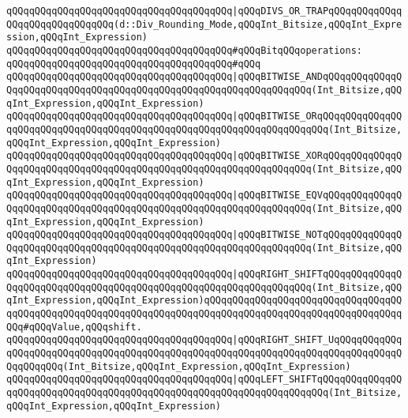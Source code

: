 \verb|qQQqqQQqqQQqqQQqqQQqqQQqqQQqqQQqqQQqqQQq|\verb#|qQQqDIVS_OR_TRAPqQQqqQQqqQQqqQQqqQQqqQQqqQQqqQQq(d::Div_Rounding_Mode,qQQqInt_Bitsize,qQQqInt_Expression,qQQqInt_Expression)#\newline
\newline
\verb|qQQqqQQqqQQqqQQqqQQqqQQqqQQqqQQqqQQqqQQq#qQQqBitqQQqoperations:|\newline
\verb|qQQqqQQqqQQqqQQqqQQqqQQqqQQqqQQqqQQqqQQq#qQQq|\newline
\verb|qQQqqQQqqQQqqQQqqQQqqQQqqQQqqQQqqQQqqQQq|\verb#|qQQqBITWISE_ANDqQQqqQQqqQQqqQQqqQQqqQQqqQQqqQQqqQQqqQQqqQQqqQQqqQQqqQQqqQQqqQQqqQQq(Int_Bitsize,qQQqInt_Expression,qQQqInt_Expression)#\newline
\verb|qQQqqQQqqQQqqQQqqQQqqQQqqQQqqQQqqQQqqQQq|\verb#|qQQqBITWISE_ORqQQqqQQqqQQqqQQqqQQqqQQqqQQqqQQqqQQqqQQqqQQqqQQqqQQqqQQqqQQqqQQqqQQqqQQq(Int_Bitsize,qQQqInt_Expression,qQQqInt_Expression)#\newline
\verb|qQQqqQQqqQQqqQQqqQQqqQQqqQQqqQQqqQQqqQQq|\verb#|qQQqBITWISE_XORqQQqqQQqqQQqqQQqqQQqqQQqqQQqqQQqqQQqqQQqqQQqqQQqqQQqqQQqqQQqqQQqqQQq(Int_Bitsize,qQQqInt_Expression,qQQqInt_Expression)#\newline
\verb|qQQqqQQqqQQqqQQqqQQqqQQqqQQqqQQqqQQqqQQq|\verb#|qQQqBITWISE_EQVqQQqqQQqqQQqqQQqqQQqqQQqqQQqqQQqqQQqqQQqqQQqqQQqqQQqqQQqqQQqqQQqqQQq(Int_Bitsize,qQQqInt_Expression,qQQqInt_Expression)#\newline
\verb|qQQqqQQqqQQqqQQqqQQqqQQqqQQqqQQqqQQqqQQq|\verb#|qQQqBITWISE_NOTqQQqqQQqqQQqqQQqqQQqqQQqqQQqqQQqqQQqqQQqqQQqqQQqqQQqqQQqqQQqqQQqqQQq(Int_Bitsize,qQQqInt_Expression)#\newline
\newline
\verb|qQQqqQQqqQQqqQQqqQQqqQQqqQQqqQQqqQQqqQQq|\verb#|qQQqRIGHT_SHIFTqQQqqQQqqQQqqQQqqQQqqQQqqQQqqQQqqQQqqQQqqQQqqQQqqQQqqQQqqQQqqQQqqQQq(Int_Bitsize,qQQqInt_Expression,qQQqInt_Expression)qQQqqQQqqQQqqQQqqQQqqQQqqQQqqQQqqQQqqQQqqQQqqQQqqQQqqQQqqQQqqQQqqQQqqQQqqQQqqQQqqQQqqQQqqQQqqQQqqQQqqQQqqQQq#\verb|#qQQqValue,qQQqshift.|\newline
\verb|qQQqqQQqqQQqqQQqqQQqqQQqqQQqqQQqqQQqqQQq|\verb#|qQQqRIGHT_SHIFT_UqQQqqQQqqQQqqQQqqQQqqQQqqQQqqQQqqQQqqQQqqQQqqQQqqQQqqQQqqQQqqQQqqQQqqQQqqQQqqQQqqQQqqQQqqQQq(Int_Bitsize,qQQqInt_Expression,qQQqInt_Expression)#\newline
\verb|qQQqqQQqqQQqqQQqqQQqqQQqqQQqqQQqqQQqqQQq|\verb#|qQQqLEFT_SHIFTqQQqqQQqqQQqqQQqqQQqqQQqqQQqqQQqqQQqqQQqqQQqqQQqqQQqqQQqqQQqqQQqqQQqqQQq(Int_Bitsize,qQQqInt_Expression,qQQqInt_Expression)#\newline
\newline
